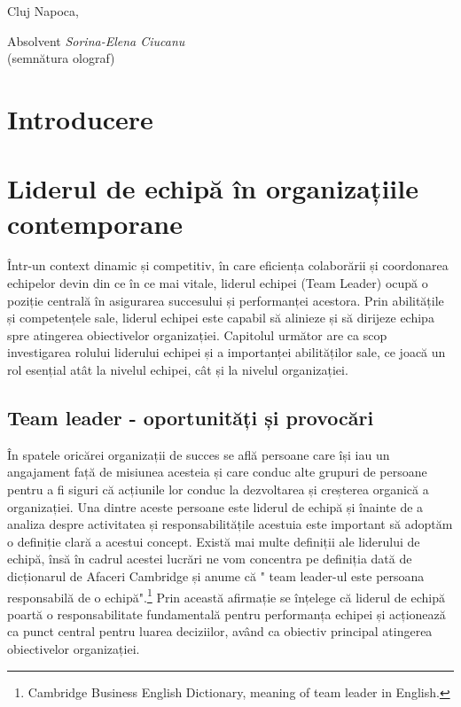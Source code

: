 \documentclass[a4paper, 12pt]{article}
\begin{document}
\vspace{3 cm}
\begin{flushleft}
	\large Cluj Napoca,
\end{flushleft}


\begin{flushright}
	\hfill \large Absolvent \textit{Sorina-Elena Ciucanu} \\
	\hfill \large {(semnătura olograf)}
\end{flushright}
\newpage
\thispagestyle{empty}
\tableofcontents
\thispagestyle{empty}
\newpage
\thispagestyle{empty}
\listoffigures
\newpage
\thispagestyle{empty}
\listoftables


\newpage



	\section*{Introducere}

\newpage
	\setcounter{section}{0}
	\section{Liderul de echipă în organizațiile contemporane}
\quad \quad\space Într-un context dinamic și competitiv, în care eficiența colaborării și coordonarea echipelor devin din ce în ce mai vitale, liderul echipei (Team Leader) ocupă o poziție centrală în asigurarea succesului și performanței acestora. Prin abilitățile și competențele sale, liderul echipei este capabil să alinieze și să dirijeze echipa spre atingerea obiectivelor organizației. Capitolul următor are ca scop investigarea rolului liderului echipei și a importanței abilităților sale, ce joacă un rol esențial atât la nivelul echipei, cât și la nivelul organizației.
		\subsection{ Team leader - oportunități și provocări}

\quad\quad\space În spatele oricărei organizații de succes se află persoane care își iau un angajament față de misiunea acesteia și care conduc alte grupuri de persoane pentru a fi siguri că acțiunile lor conduc la dezvoltarea și creșterea organică a organizației. Una dintre aceste persoane este liderul de echipă și înainte de a analiza despre activitatea și responsabilitățile acestuia este important să adoptăm o definiție clară a acestui concept. Există mai multe definiții ale liderului de echipă, însă în cadrul acestei lucrări ne vom concentra pe definiția dată de dicționarul de Afaceri Cambridge și anume că " team leader-ul  este persoana responsabilă de o echipă".\footnote{Cambridge Business English Dictionary, meaning of team leader in English.} Prin această afirmație se înțelege că liderul de echipă poartă o responsabilitate fundamentală pentru performanța echipei și acționează ca punct central pentru luarea deciziilor, având ca obiectiv principal atingerea obiectivelor organizației.
\end{document}
